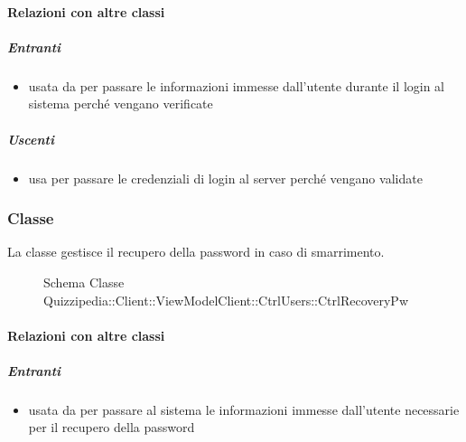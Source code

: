 \paragraph{Relazioni con altre classi}
\subparagraph{Entranti}
\begin{itemize}
\item usata da  per passare le informazioni immesse dall'utente durante il login al sistema perché vengano verificate
\end{itemize}
\subparagraph{Uscenti}
\begin{itemize}
\item usa  per passare le credenziali di login al server perché vengano validate
\end{itemize}
\subsubsection{Classe }
La classe gestisce il recupero della password in caso di smarrimento.
\begin{figure}[H]
\centering
\noindent{}
\caption[Schema Classe CtrlRecoveryPw]{Schema Classe Quizzipedia::Client::ViewModelClient::CtrlUsers::CtrlRecoveryPw}
\end{figure}
\paragraph{Relazioni con altre classi}
\subparagraph{Entranti}
\begin{itemize}
\item usata da  per passare al sistema le informazioni immesse dall'utente necessarie per il recupero della password
\end{itemize}
